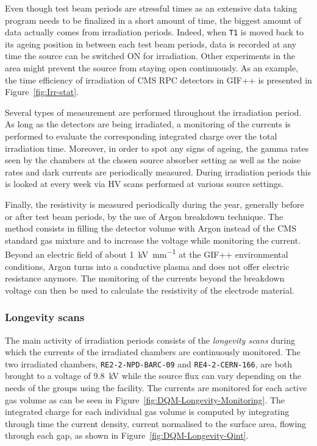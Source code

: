 	Even though test beam periods are stressful times as an extensive data taking program needs to be finalized in a short amount of time, the biggest amount of data actually comes from irradiation periods. Indeed, when \texttt{T1} is moved back to its ageing position in between each test beam periods, data is recorded at any time the source can be switched ON for irradiation. Other experiments in the area might prevent the source from staying open continuously. As an example, the time efficiency of irradiation of CMS RPC detectors in GIF++ is presented in Figure~\ref{fig:Irr-stat}.
	
	Several types of measurement are performed throughout the irradiation period. As long as the detectors are being irradiated, a monitoring of the currents is performed to evaluate the corresponding integrated charge over the total irradiation time. Moreover, in order to spot any signs of ageing, the gamma rates seen by the chambers at the chosen source absorber setting as well as the noise rates and dark currents are periodically measured. During irradiation periods this is looked at every week via HV scans performed at various source settings.
	
	Finally, the resistivity is measured periodically during the year, generally before or after test beam periods, by the use of Argon breakdown technique. The method consists in filling the detector volume with Argon instead of the CMS standard gas mixture and to increase the voltage while monitoring the current. Beyond an electric field of about \SI{1}{kV.mm^{-1}} at the GIF++ environmental conditions, Argon turns into a conductive plasma and does not offer electric resistance anymore. The monitoring of the currents beyond the breakdown voltage can then be used to calculate the resistivity of the electrode material.
	
		\subsubsection{Longevity scans}
		\label{chapt5:sssec:longscan}
	
	The main activity of irradiation periods consists of the \textit{longevity scans} during which the currents of the irradiated chambers are continuously monitored. The two irradiated chambers, \texttt{RE2-2-NPD-BARC-09} and \texttt{RE4-2-CERN-166}, are both brought to a voltage of \SI{9.8}{kV} while the source flux can vary depending on the needs of the groups using the facility. The currents are monitored for each active gas volume as can be seen in Figure~\ref{fig:DQM-Longevity-Monitoring}. The integrated charge for each individual gas volume is computed by integrating through time the current density, current normalised to the surface area, flowing through each gap, as shown in Figure~\ref{fig:DQM-Longevity-Qint}.
	
